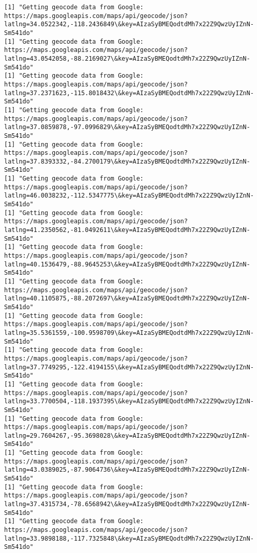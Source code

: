 \documentclass[11pt]{article}
\begin{document}
\begin{Verbatim}[commandchars=\\\{\}]
[1] "Getting geocode data from Google: https://maps.googleapis.com/maps/api/geocode/json?latlng=34.0522342,-118.2436849\&key=AIzaSyBMEQodtdMh7x22Z9QwzUyIZnN-Sm541do"
[1] "Getting geocode data from Google: https://maps.googleapis.com/maps/api/geocode/json?latlng=43.0542058,-88.2169027\&key=AIzaSyBMEQodtdMh7x22Z9QwzUyIZnN-Sm541do"
[1] "Getting geocode data from Google: https://maps.googleapis.com/maps/api/geocode/json?latlng=37.2371623,-115.8018432\&key=AIzaSyBMEQodtdMh7x22Z9QwzUyIZnN-Sm541do"
[1] "Getting geocode data from Google: https://maps.googleapis.com/maps/api/geocode/json?latlng=37.0859878,-97.0996829\&key=AIzaSyBMEQodtdMh7x22Z9QwzUyIZnN-Sm541do"
[1] "Getting geocode data from Google: https://maps.googleapis.com/maps/api/geocode/json?latlng=37.8393332,-84.2700179\&key=AIzaSyBMEQodtdMh7x22Z9QwzUyIZnN-Sm541do"
[1] "Getting geocode data from Google: https://maps.googleapis.com/maps/api/geocode/json?latlng=46.0038232,-112.5347775\&key=AIzaSyBMEQodtdMh7x22Z9QwzUyIZnN-Sm541do"
[1] "Getting geocode data from Google: https://maps.googleapis.com/maps/api/geocode/json?latlng=41.2350562,-81.0492611\&key=AIzaSyBMEQodtdMh7x22Z9QwzUyIZnN-Sm541do"
[1] "Getting geocode data from Google: https://maps.googleapis.com/maps/api/geocode/json?latlng=40.1536479,-88.9645253\&key=AIzaSyBMEQodtdMh7x22Z9QwzUyIZnN-Sm541do"
[1] "Getting geocode data from Google: https://maps.googleapis.com/maps/api/geocode/json?latlng=40.1105875,-88.2072697\&key=AIzaSyBMEQodtdMh7x22Z9QwzUyIZnN-Sm541do"
[1] "Getting geocode data from Google: https://maps.googleapis.com/maps/api/geocode/json?latlng=35.5361559,-100.9598709\&key=AIzaSyBMEQodtdMh7x22Z9QwzUyIZnN-Sm541do"
[1] "Getting geocode data from Google: https://maps.googleapis.com/maps/api/geocode/json?latlng=37.7749295,-122.4194155\&key=AIzaSyBMEQodtdMh7x22Z9QwzUyIZnN-Sm541do"
[1] "Getting geocode data from Google: https://maps.googleapis.com/maps/api/geocode/json?latlng=33.7700504,-118.1937395\&key=AIzaSyBMEQodtdMh7x22Z9QwzUyIZnN-Sm541do"
[1] "Getting geocode data from Google: https://maps.googleapis.com/maps/api/geocode/json?latlng=29.7604267,-95.3698028\&key=AIzaSyBMEQodtdMh7x22Z9QwzUyIZnN-Sm541do"
[1] "Getting geocode data from Google: https://maps.googleapis.com/maps/api/geocode/json?latlng=43.0389025,-87.9064736\&key=AIzaSyBMEQodtdMh7x22Z9QwzUyIZnN-Sm541do"
[1] "Getting geocode data from Google: https://maps.googleapis.com/maps/api/geocode/json?latlng=37.4315734,-78.6568942\&key=AIzaSyBMEQodtdMh7x22Z9QwzUyIZnN-Sm541do"
[1] "Getting geocode data from Google: https://maps.googleapis.com/maps/api/geocode/json?latlng=33.9898188,-117.7325848\&key=AIzaSyBMEQodtdMh7x22Z9QwzUyIZnN-Sm541do"

\end{Verbatim}
\end{document}
